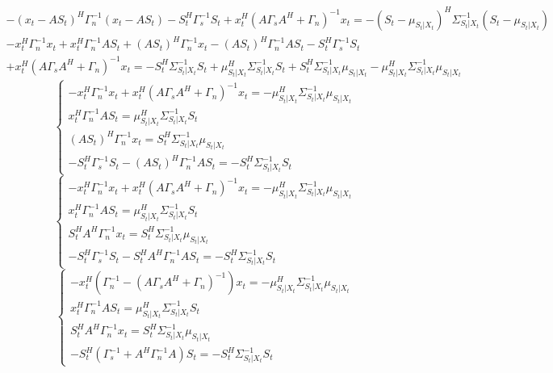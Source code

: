 \documentclass[11pt]{article}
\begin{document}
\begin{center}
\fontsize{16}{20}\selectfont {}
\end{center}
\begin{gather*}
-(x_t-A S_t)^H \Gamma_n^{-1}(x_t-A S_t)-S_t^H\Gamma_s^{-1}S_t+x_t^H (A\Gamma_s  A^H + \Gamma_n)^{-1}x_t = -(S_t-\mu_{S_t|X_t})^H \Sigma_{S_t|X_t}^{-1}(S_t-\mu_{S_t|X_t})
\nonumber
\end{gather*}
\begin{gather*}
-x_t^H\Gamma_n^{-1}x_t + x_t^H\Gamma_n^{-1}A S_t + (A S_t)^H\Gamma_n^{-1}x_t - (A S_t)^H \Gamma_n^{-1} A S_t -S_t^H\Gamma_s^{-1}S_t \\
+x_t^H (A\Gamma_s  A^H + \Gamma_n)^{-1}x_t  =-S_t^H \Sigma_{S_t|X_t}^{-1}S_t + \mu_{S_t|X_t}^H  \Sigma_{S_t|X_t}^{-1}S_t   + S_t^H \Sigma_{S_t|X_t}^{-1}\mu_{S_t|X_t} - \mu_{S_t|X_t}^H \Sigma_{S_t|X_t}^{-1}\mu_{S_t|X_t}
\end{gather*}
\begin{equation*}
\left\{ \begin{aligned} 
 -x_t^H\Gamma_n^{-1}x_t + x_t^H (A\Gamma_s  A^H + \Gamma_n)^{-1}x_t = -\mu_{S_t|X_t}^H \Sigma_{S_t|X_t}^{-1}\mu_{S_t|X_t}\\
x_t^H\Gamma_n^{-1}A S_t = \mu_{S_t|X_t}^H  \Sigma_{S_t|X_t}^{-1}S_t \\
(A S_t)^H\Gamma_n^{-1}x_t = S_t^H \Sigma_{S_t|X_t}^{-1}\mu_{S_t|X_t} \\
-S_t^H\Gamma_s^{-1}S_t - (A S_t)^H \Gamma_n^{-1} A S_t = -S_t^H \Sigma_{S_t|X_t}^{-1}S_t
\end{aligned} \right.
\end{equation*}
\begin{equation*}
\left\{ \begin{aligned} 
 -x_t^H\Gamma_n^{-1}x_t + x_t^H (A\Gamma_s  A^H + \Gamma_n)^{-1}x_t = -\mu_{S_t|X_t}^H \Sigma_{S_t|X_t}^{-1}\mu_{S_t|X_t}\\
x_t^H\Gamma_n^{-1}A S_t = \mu_{S_t|X_t}^H  \Sigma_{S_t|X_t}^{-1}S_t \\
S_t^H A^H\Gamma_n^{-1}x_t = S_t^H \Sigma_{S_t|X_t}^{-1}\mu_{S_t|X_t} \\
-S_t^H\Gamma_s^{-1}S_t - S_t^H A^H \Gamma_n^{-1} A S_t = -S_t^H \Sigma_{S_t|X_t}^{-1}S_t
\end{aligned} \right.
\end{equation*}
\begin{equation*}
\left\{ \begin{aligned} 
 -x_t^H(\Gamma_n^{-1}- (A\Gamma_s  A^H+\Gamma_n)^{-1})x_t  = -\mu_{S_t|X_t}^H \Sigma_{S_t|X_t}^{-1}\mu_{S_t|X_t}\\
x_t^H\Gamma_n^{-1}A S_t = \mu_{S_t|X_t}^H  \Sigma_{S_t|X_t}^{-1}S_t \\
S_t^H A^H\Gamma_n^{-1}x_t = S_t^H \Sigma_{S_t|X_t}^{-1}\mu_{S_t|X_t} \\
-S_t^H(\Gamma_s^{-1}+A^H \Gamma_n^{-1} A)S_t = -S_t^H \Sigma_{S_t|X_t}^{-1}S_t
\end{aligned} \right.
\end{equation*}
\end{document}
